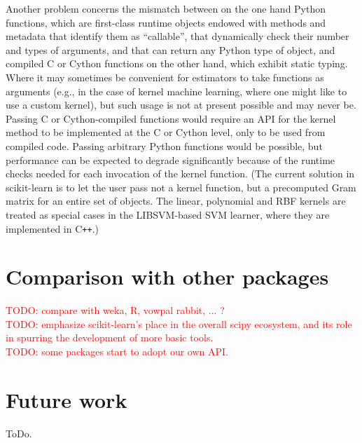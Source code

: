 \documentclass{llncs}
\DeclareRobustCommand{\VAN}[3]{#2}
\begin{document}
Another problem concerns the mismatch between on the one hand Python functions,
which are first-class runtime objects endowed with methods and metadata
that identify them as ``callable'',
that dynamically check their number and types of arguments,
and that can return any Python type of object,
and compiled C or Cython functions on the other hand,
which exhibit static typing.
Where it may sometimes be convenient for estimators
to take functions as arguments
(e.g., in the case of kernel machine learning,
where one might like to use a custom kernel),
but such usage is not at present possible and may never be.
Passing C or Cython-compiled functions would require an API for the kernel method
to be implemented at the C or Cython level,
only to be used from compiled code.
Passing arbitrary Python functions would be possible,
but performance can be expected to degrade significantly
because of the runtime checks needed for each invocation of the kernel function.
(The current solution in scikit-learn is to let the user pass not a kernel function,
but a precomputed Gram matrix for an entire set of objects.
The linear, polynomial and RBF kernels are treated as special cases in
the \textsf{LIBSVM}-based SVM learner, where they are implemented in C{}\verb!++!.)

\section{Comparison with other packages}

\label{sec:comparison}

\textcolor{red}{TODO: compare with weka, R, vowpal rabbit, ... ?}\\
\textcolor{red}{TODO: emphasize scikit-learn's place in the overall scipy ecosystem, and its role in spurring the development of more basic tools.}\\
\textcolor{red}{TODO: some packages start to adopt our own API.}

\section{Future work}

ToDo.


\DeclareRobustCommand{\VAN}[3]{#3}

\end{document}
